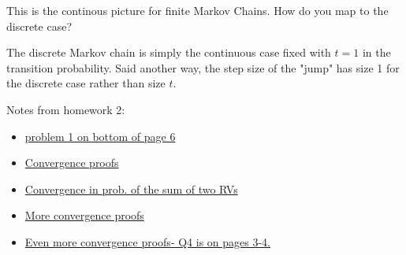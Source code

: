 \begin{quest}
	\item This is the continous picture for finite Markov Chains. How do you map to the discrete case?
	\begin{ans}
		The discrete Markov chain is simply the continuous case fixed with $t = 1$ in the transition probability. Said another way, the step size of the "jump" has size 1 for the discrete case rather than size $t$. 
	\end{ans}
\end{quest}

Notes from homework 2:
\begin{itemize}
  \item \href{http://web.math.ku.dk/noter/filer/vidsand12.pdf}{problem 1 on  bottom of page 6}
  \item \href{https://en.wikipedia.org/wiki/Proofs_of_convergence_of_random_variables#:~:text=Convergence%20almost%20surely%20implies%20convergence%20in%20probability,-Proof%3A%20If%20%7BX&text=This%20means%20that%20A%E2%88%9E,(A%E2%88%9E)%20%3D%200.&text=which%20by%20definition%20means%20that%20Xn%20converges%20in%20probability%20to%20X.}{Convergence proofs}
  \item \href{https://youtu.be/AH5jnR3RxJU}{Convergence in prob. of the sum of two RVs}
  \item \href{http://www.ma.huji.ac.il/~razk/Teaching/LectureNotes/Probability/Chapter7.pdf}{More convergence proofs}
  \item \href{http://www.stat.cmu.edu/~larry/=stat325.01/chapter5.pdf}{Even more convergence proofs- Q4 is on pages 3-4.}
\end{itemize}


